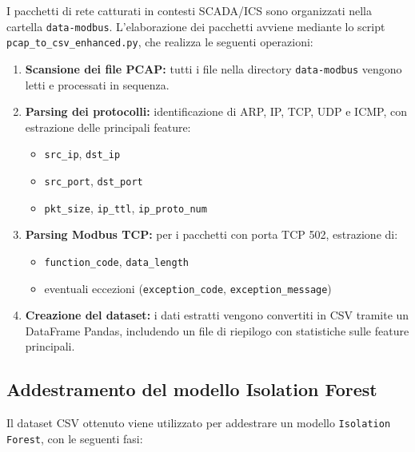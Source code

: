 I pacchetti di rete catturati in contesti SCADA/ICS sono organizzati nella cartella \texttt{data-modbus}. L'elaborazione dei pacchetti avviene mediante lo script \texttt{pcap\_to\_csv\_enhanced.py}, che realizza le seguenti operazioni:

\begin{enumerate}
    \item \textbf{Scansione dei file PCAP:} tutti i file nella directory \texttt{data-modbus} vengono letti e processati in sequenza.
    \item \textbf{Parsing dei protocolli:} identificazione di ARP, IP, TCP, UDP e ICMP, con estrazione delle principali feature:
    \begin{itemize}
        \item \texttt{src\_ip}, \texttt{dst\_ip}
        \item \texttt{src\_port}, \texttt{dst\_port}
        \item \texttt{pkt\_size}, \texttt{ip\_ttl}, \texttt{ip\_proto\_num}
    \end{itemize}
    \item \textbf{Parsing Modbus TCP:} per i pacchetti con porta TCP 502, estrazione di:
    \begin{itemize}
        \item \texttt{function\_code}, \texttt{data\_length}
        \item eventuali eccezioni (\texttt{exception\_code}, \texttt{exception\_message})
    \end{itemize}
    \item \textbf{Creazione del dataset:} i dati estratti vengono convertiti in CSV tramite un DataFrame Pandas, includendo un file di riepilogo con statistiche sulle feature principali.
\end{enumerate}

\subsection{Addestramento del modello Isolation Forest}

Il dataset CSV ottenuto viene utilizzato per addestrare un modello \texttt{Isolation Forest}, con le seguenti fasi:

